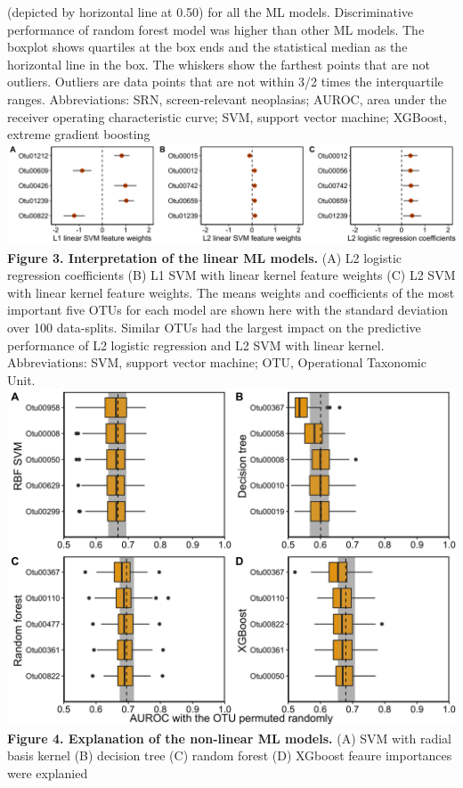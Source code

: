 \documentclass[11pt,]{article}
\begin{document}
(depicted by horizontal line at 0.50) for all the ML models.
Discriminative performance of random forest model was higher than other
ML models. The boxplot shows quartiles at the box ends and the
statistical median as the horizontal line in the box. The whiskers show
the farthest points that are not outliers. Outliers are data points that
are not within 3/2 times the interquartile ranges. Abbreviations: SRN,
screen-relevant neoplasias; AUROC, area under the receiver operating
characteristic curve; SVM, support vector machine; XGBoost, extreme
gradient boosting \newpage
\includegraphics{Figure_3.png} \textbf{Figure 3. Interpretation of the
linear ML models.} (A) L2 logistic regression coefficients (B) L1 SVM
with linear kernel feature weights (C) L2 SVM with linear kernel feature
weights. The means weights and coefficients of the most important five
OTUs for each model are shown here with the standard deviation over 100
data-splits. Similar OTUs had the largest impact on the predictive
performance of L2 logistic regression and L2 SVM with linear kernel.
Abbreviations: SVM, support vector machine; OTU, Operational Taxonomic
Unit. \newpage
\includegraphics{Figure_4.png} \textbf{Figure 4. Explanation of the
non-linear ML models.} (A) SVM with radial basis kernel (B) decision
tree (C) random forest (D) XGboost feaure importances were explanied
\end{document}
